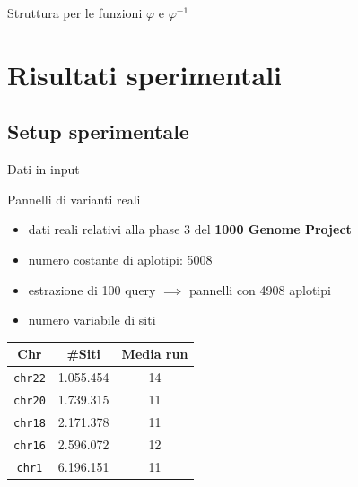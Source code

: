 \documentclass[]{beamer}
\def\rank{\mbox{\rm {\sf rank}}}
\def\PBWT{\mbox{\rm {\sf PBWT}}}
\def\RLPBWT{\mbox{\rm {\sf RLPBWT}}}
\def\Cplusplus{C\raisebox{0.5ex}{\tiny\textbf{++}}}
\begin{document}
\begin{frame}{Struttura per le funzioni $\varphi$ e $\varphi^{-1}$}
\begin{figure}[H]
  \end{figure}
  
\end{frame}
\section{Risultati sperimentali}
\subsection{Setup sperimentale}
\begin{frame}{Dati in input}
  \begin{block}{Pannelli di varianti reali}
    \begin{itemize}
      \item dati reali relativi alla phase 3 del \textbf{1000 Genome Project}
      \item numero costante di aplotipi: 5008
      \item estrazione di 100 query $\implies$ pannelli con 4908 aplotipi
      \item numero variabile di siti
    \end{itemize}
  \end{block}
  \begin{table}[H]
    \centering
    \begin{tabular}{c||c|c}
      \textbf{Chr} & \textbf{\#Siti} & \textbf{Media run} \\ 
      \hline
      \texttt{chr22} & 1.055.454 & 14\\
      \texttt{chr20} & 1.739.315 & 11\\
      \texttt{chr18} & 2.171.378 & 11\\
      \texttt{chr16} & 2.596.072 & 12\\
      \texttt{chr1} & 6.196.151 & 11\\
    \end{tabular}
  \end{table}
\end{frame}
\end{document}
